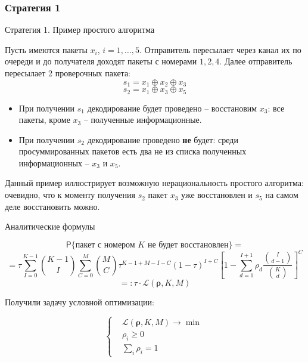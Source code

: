 \documentclass{beamer}
\begin{document}
\subsubsection{Стратегия 1}

\begin{frame}{Стратегия 1. Пример простого алгоритма}
    
Пусть имеются пакеты $x_i$, $i=1,\dots, 5$. Отправитель пересылает
через канал их по очереди и до получателя доходят пакеты с номерами
$1, 2, 4$. Далее отправитель пересылает 2 проверочных пакета:
\[s_1 = x_1 \oplus x_2 \oplus x_3\]
\[s_2 = x_1 \oplus x_3 \oplus x_5\]

\begin{itemize}
    \item При получении $s_1$ декодирование будет проведено -- 
    восстановим $x_3$: все пакеты, кроме $x_3$
    -- полученные информационные.
    \item При получении $s_2$ декодирование
    проведено \textbf{не} будет: среди просуммированных пакетов есть 
    два не из списка полученных информационных -- $x_3$ и $x_5$. 
\end{itemize}
 
Данный пример иллюстрирует возможную нерациональность простого алгоритма:
очевидно, что к моменту получения $s_2$ пакет $x_3$ уже восстановлен
и $s_5$ на самом деле восстановить можно.
    
\end{frame}

\begin{frame}{Аналитические формулы}

\[
\mathsf P\{\text{пакет с номером $K$ не будет восстановлен}\} =
\]
\[
=\tau\sum_{I=0}^{K-1}\binom{K - 1}{I}\sum_{C=0}^{M}\binom{M}{C}
\tau^{K - 1 + M - I - C}(1-\tau)^{I + C}\left[
    1 - \sum_{d=1}^{I + 1}\rho_d\frac{\binom{I}{d-1}}{\binom{K}{d}}
\right]^C
\]
\[
=:\tau\cdot \mathcal L(\boldsymbol{\rho}, K, M) 
\]

Получили задачу условной оптимизации:

\[
    \left\{
    \begin{aligned}
        &\mathcal L(\boldsymbol{\rho}, K, M)\to\min\\
        &\rho_i\ge0\\
        &\sum_i \rho_i = 1
    \end{aligned}
    \right.
\]
    
\end{frame}
\end{document}
